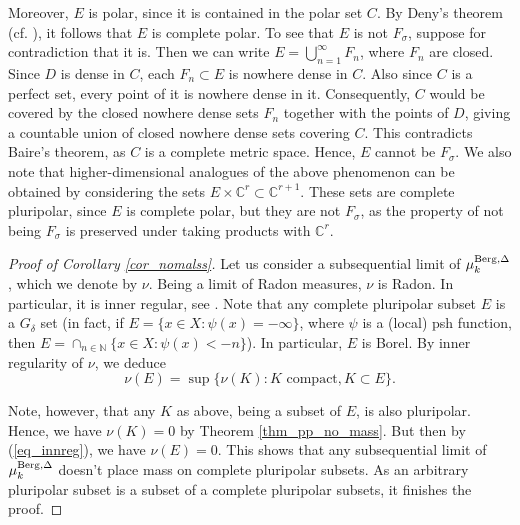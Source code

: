 \documentclass[12pt]{article}
\numberwithin{equation}{section}
\theoremstyle{theorem}
\theoremstyle{definition}
\theoremstyle{remark}
\newcommand{\nat}{\mathbb{N}}
\begin{document}
	Moreover, $E$ is polar, since it is contained in the polar set $C$. By Deny's theorem \cite{DenyThmGDelta} (cf. \cite[\S 3.5]{Ransford}), it follows that $E$ is complete polar.  
	To see that $E$ is not $F_\sigma$, suppose for contradiction that it is. Then we can write $E = \bigcup_{n=1}^\infty F_n$, where $F_n$ are closed.
	Since $D$ is dense in $C$, each $F_n \subset E$ is nowhere dense in $C$. 
	Also since $C$ is a perfect set, every point of it is nowhere dense in it.
	Consequently, $C$ would be covered by the closed nowhere dense sets $F_n$ together with the points of $D$, giving a countable union of closed nowhere dense sets covering $C$. 
	This contradicts Baire's theorem, as $C$ is a complete metric space. Hence, $E$ cannot be $F_\sigma$.
	We also note that higher-dimensional analogues of the above phenomenon can be obtained by considering the sets $E \times \mathbb{C}^r \subset \mathbb{C}^{r+1}$.
	These sets are complete pluripolar, since $E$ is complete polar, but they are not $F_\sigma$, as the property of not being $F_\sigma$ is preserved under taking products with $\mathbb{C}^r$.
	\par 
	\begin{proof}[Proof of Corollary \ref{cor_nomalss}]
		Let us consider a subsequential limit of $\mu_k^{\rm{Berg}, \Delta}$, which we denote by $\nu$.
		Being a limit of Radon measures, $\nu$ is Radon.
		In particular, it is inner regular, see \cite[Definition 1.9 and Theorems 1.8, 1.39, 1.41]{EvansGariepy}.
		Note that any complete pluripolar subset $E$ is a $G_\delta$ set (in fact, if $E = \{ x \in X : \psi(x) = - \infty \}$, where $\psi$ is a (local) psh function, then $E = \cap_{n \in \nat} \{ x \in X : \psi(x) < -n \}$).
		In particular, $E$ is Borel.
		By inner regularity of $\nu$, we deduce 
		\begin{equation}\label{eq_innreg}
			\nu(E) = \sup \Big\{ \nu(K) : K \text{ compact}, K \subset E \Big\}.
		\end{equation}
		\par  
		Note, however, that any $K$ as above, being a subset of $E$, is also pluripolar. 
		Hence, we have $\nu(K) = 0$ by Theorem \ref{thm_pp_no_mass}. 
		But then by (\ref{eq_innreg}), we have $\nu(E) = 0$.
		This shows that any subsequential limit of $\mu_k^{\rm{Berg}, \Delta}$ doesn't place mass on complete pluripolar subsets.
		As an arbitrary pluripolar subset is a subset of a complete pluripolar subsets, it finishes the proof.
	\end{proof}
	
\end{document}
